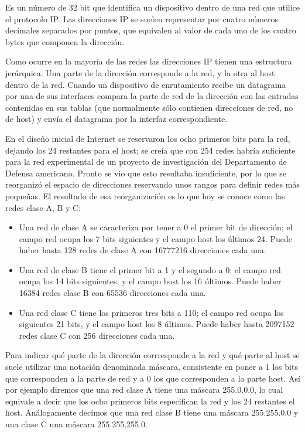 Es un número de 32 bit que identifica un dispositivo dentro de una red que utilice el protocolo IP. Las direcciones IP se suelen representar por cuatro números decimales separados por puntos, que equivalen al valor de cada uno de los cuatro bytes que componen la dirección.

Como ocurre en la mayoría de las redes las direcciones IP tienen una estructura jerárquica. Una parte de la dirección corresponde a la red, y la otra al host dentro de la red. Cuando un dispositivo de enrutamiento recibe un datagrama por una de sus interfaces compara la parte de red de la dirección con las entradas contenidas en sus tablas (que normalmente sólo contienen direcciones de red, no de host) y envía el datagrama por la interfaz correspondiente.
 
En el diseño inicial de Internet se reservaron los ocho primeros bits para la red, dejando los 24 restantes para el host; se creía que con 254 redes habría suficiente para la red experimental de un proyecto de investigación del Departamento de Defensa americano. Pronto se vio que esto resultaba insuficiente, por lo que se reorganizó el espacio de direcciones reservando unos rangos para definir redes más pequeñas. El resultado de esa reorganización es lo que hoy se conoce como las redes clase A, B y C:

\begin{itemize}
	\item Una red de clase A se caracteriza por tener a 0 el primer bit de dirección; el campo red ocupa los 7 bits siguientes y el campo host los últimos 24. Puede haber hasta 128 redes de clase A con 16777216 direcciones cada una.

	\item Una red de clase B tiene el primer bit a 1 y el segundo a 0; el campo red ocupa los 14 bits  siguientes, y el campo host los 16 últimos. Puede haber 16384 redes clase B con 65536  direcciones cada una.
	
	\item Una red clase C tiene los primeros tres bits a 110; el campo red ocupa los siguientes 21 bits, y el  campo host los 8 últimos. Puede haber hasta 2097152 redes clase C con 256 direcciones cada una.
\end{itemize}

Para indicar qué parte de la dirección corrresponde a la red y qué parte al host se suele utilizar una notación denominada máscara, consistente en poner a 1 los bits que corresponden a la parte de red y a 0 los que corresponden a la parte host. Así por ejemplo diremos que una red clase A tiene una máscara 255.0.0.0, lo cual equivale a decir que los ocho primeros bits especifican la red y los 24 restantes el host. Análogamente decimos que una red clase B tiene una máscara 255.255.0.0 y una clase C una máscara 255.255.255.0.

